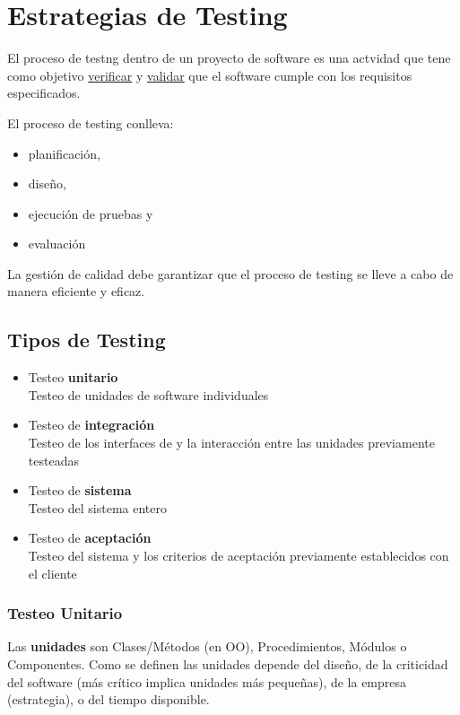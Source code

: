 \chapter{Estrategias de Testing}
\label{chap:estrategias-de-testing}


El proceso de testng dentro de un proyecto de software es una actvidad que tene como objetivo \ul{verificar} y \ul{validar} que el software cumple con los requisitos especificados.

El proceso de testing conlleva:
\begin{itemize}
	\item planificación,
	\item diseño,
	\item ejecución de pruebas y
	\item evaluación
\end{itemize}
La gestión de calidad debe garantizar que el proceso de
testing se lleve a cabo de manera eficiente y eficaz.

\section{Tipos de Testing}
\begin{itemize}
	\item Testeo \textbf{unitario}\\
   Testeo de unidades de software individuales
	\item Testeo de \textbf{integración}\\
   Testeo de los interfaces de y la interacción entre las unidades previamente testeadas
	\item Testeo de \textbf{sistema}\\
   Testeo del sistema entero
	\item Testeo de \textbf{aceptación}\\
   Testeo del sistema y los criterios de aceptación previamente establecidos con el cliente
\end{itemize}

\subsection{Testeo Unitario}
Las \textbf{unidades} son Clases/Métodos (en OO), Procedimientos, Módulos o Componentes. Como se definen las unidades depende del diseño, de la criticidad del software (más crítico implica unidades más pequeñas), de la empresa (estrategia), o del tiempo disponible.


